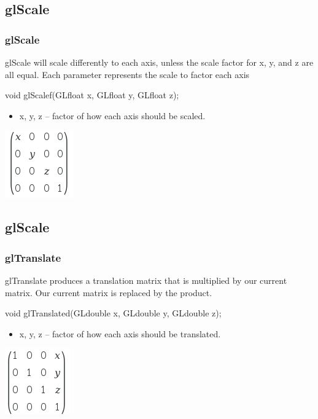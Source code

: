 \documentclass{beamer}
\begin{document}
          \subsection{glScale}
          \begin{frame}
            \frametitle{glScale}
            glScale will scale differently to each axis, unless the scale factor for x, y, and z are all equal. Each parameter represents the scale to factor each axis
            \begin{block}{void glScalef(GLfloat x, GLfloat y, GLfloat z);}
              \begin{itemize}
              \item x, y, z -- factor of how each axis should be scaled.
              \end{itemize}
            \end{block}
            \includegraphics[scale=.35]{scale_matrix.png}
          \end{frame}


          \subsection{glScale}
          \begin{frame}
            \frametitle{glTranslate}
            glTranslate produces a translation matrix that is multiplied by our current matrix. Our current matrix is replaced by the product.
            \begin{block}{void glTranslated(GLdouble x, GLdouble y, GLdouble z);}
              \begin{itemize}
              \item x, y, z -- factor of how each axis should be translated.
              \end{itemize}
            \end{block}
            \includegraphics[scale=.35]{translate_matrix.png}
          \end{frame}
\end{document}
